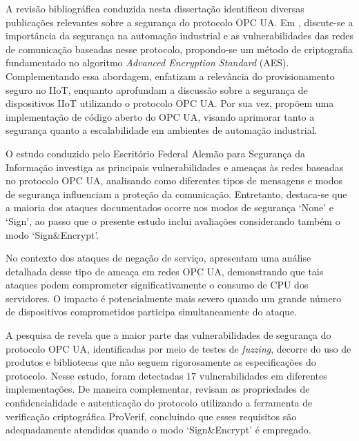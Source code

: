     A revisão bibliográfica conduzida nesta dissertação identificou diversas publicações relevantes sobre a segurança do protocolo OPC UA. Em , discute-se a importância da segurança na automação industrial e as vulnerabilidades das redes de comunicação baseadas nesse protocolo, propondo-se um método de criptografia fundamentado no algoritmo \textit{Advanced Encryption Standard} (AES). Complementando essa abordagem,  enfatizam a relevância do provisionamento seguro no IIoT, enquanto  aprofundam a discussão sobre a segurança de dispositivos IIoT utilizando o protocolo OPC UA. Por sua vez,  propõem uma implementação de código aberto do OPC UA, visando aprimorar tanto a segurança quanto a escalabilidade em ambientes de automação industrial.
    
    O estudo conduzido pelo Escritório Federal Alemão para Segurança da Informação \cite{bsi2017} investiga as principais vulnerabilidades e ameaças às redes baseadas no protocolo OPC UA, analisando como diferentes tipos de mensagens e modos de segurança influenciam a proteção da comunicação. Entretanto, destaca-se que a maioria dos ataques documentados ocorre nos modos de segurança `None' e `Sign', ao passo que o presente estudo inclui avaliações considerando também o modo `Sign\&Encrypt'.
    
    No contexto dos ataques de negação de serviço,  apresentam uma análise detalhada desse tipo de ameaça em redes OPC UA, demonstrando que tais ataques podem comprometer significativamente o consumo de CPU dos servidores. O impacto é potencialmente mais severo quando um grande número de dispositivos comprometidos participa simultaneamente do ataque. 
    
    A pesquisa de  revela que a maior parte das vulnerabilidades de segurança do protocolo OPC UA, identificadas por meio de testes de \textit{fuzzing}, decorre do uso de produtos e bibliotecas que não seguem rigorosamente as especificações do protocolo. Nesse estudo, foram detectadas $17$ vulnerabilidades em diferentes implementações. De maneira complementar,  revisam as propriedades de confidencialidade e autenticação do protocolo utilizando a ferramenta de verificação criptográfica ProVerif, concluindo que esses requisitos são adequadamente atendidos quando o modo `Sign\&Encrypt' é empregado.
    
